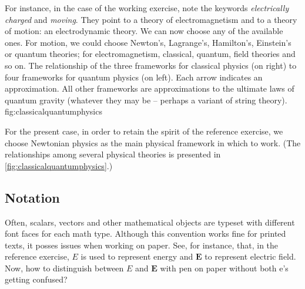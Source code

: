 For instance, in the case of the working exercise, note the keywords \emph{electrically charged} and \emph{moving}. They point to a theory of electromagnetism and to a theory of motion: an electrodynamic theory. We can now choose any of the available ones. For motion, we could choose Newton's, Lagrange's, Hamilton's, Einstein's or quantum theories; for electromagnetism, classical, quantum, field theories and so on.
%
%
{The relationship of the three frameworks for classical physics (on right) to four frameworks for quantum physics (on left).         Each arrow indicates an approximation. All other frameworks are approximations to the ultimate laws of quantum gravity (whatever   they may be -- perhaps a variant of string theory). \cite[chap. 1, p. iv]{thorne:2013}}
{fig:classicalquantumphysics}
%
%
%
%
%
%

For the present case, in order to retain the spirit of the reference exercise, we choose Newtonian physics as the main physical framework in which to work. (The relationships among several physical theories is presented in \cref{fig:classicalquantumphysics}.)


\subsection{Notation}
%
Often,
%
%
scalars, vectors and other mathematical objects are typeset with different font faces for each math type. Although this convention works fine for printed texts, it posses issues when working on paper. See, for instance, that, in the reference exercise, $E$ is used to represent energy and $\mathbf{E}$ to represent electric field. Now, how to distinguish between $E$ and $\mathbf{E}$ with pen on paper without both e's getting confused?

